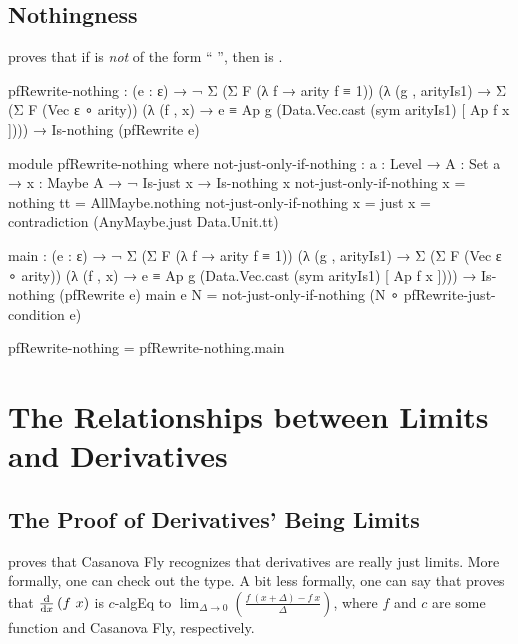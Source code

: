 \documentclass{report}
\begin{document}
\subsection{ Nothingness}
 proves that if  is \emph{not} of the form ``  \AgdaInductiveConstructor{[}    \AgdaInductiveConstructor{]}'', then   is .

\begin{code}
    pfRewrite-nothing :
      (e : ε) →
      ¬ Σ (Σ F (λ f → arity f ≡ 1))
          (λ (g , arityIs1) →
             Σ (Σ F (Vec ε ∘ arity))
               (λ (f , x) →
                  e ≡ Ap g (Data.Vec.cast (sym arityIs1) [ Ap f x ]))) →
      Is-nothing (pfRewrite e)

    module pfRewrite-nothing where
      not-just-only-if-nothing :
        {a : Level} →
        {A : Set a} →
        {x : Maybe A} →
        ¬ Is-just x →
        Is-nothing x
      not-just-only-if-nothing {x = nothing} tt = AllMaybe.nothing
      not-just-only-if-nothing {x = just x} = contradiction (AnyMaybe.just Data.Unit.tt)

      main :
        (e : ε) →
        ¬ Σ (Σ F (λ f → arity f ≡ 1))
            (λ (g , arityIs1) →
               Σ (Σ F (Vec ε ∘ arity))
                 (λ (f , x) →
                    e ≡ Ap g (Data.Vec.cast (sym arityIs1) [ Ap f x ]))) →
        Is-nothing (pfRewrite e)
      main e N = not-just-only-if-nothing (N ∘ pfRewrite-just-condition e)

    pfRewrite-nothing = pfRewrite-nothing.main
\end{code}

\section{The Relationships between Limits and Derivatives}

\subsection{The Proof of Derivatives' Being Limits}
 proves that Casanova Fly recognizes that derivatives are really just limits.  More formally, one can check out the type.  A bit less formally, one can say that  proves that \(\derivative{x} \left(f\ x\right)\) is \(c\)-\gls{algEq} to \(\lim_{\Delta \rightarrow 0} \left(\frac{f\ \left(x + \Delta\right) - f\ x}{\Delta}\right)\), where \(f\) and \(c\) are some function and Casanova Fly, respectively.
\end{document}
